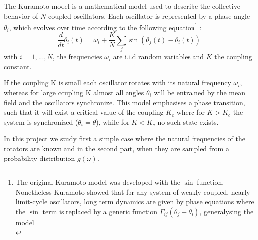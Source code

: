 
The Kuramoto model is a mathematical model used to describe the collective behavior of $N$ coupled oscillators. Each oscillator is represented by a phase angle $\theta_i$, which evolves over time according to the following equation\footnote{The original Kuramoto model was developed with the $\sin$ function. Nonetheless Kuramoto showed that for any system of weakly coupled, nearly limit-cycle oscillators, long term dynamics are given by phase equations where the $\sin$ term is replaced by a generic function $\Gamma_{ij}(\theta_j-\theta_i)$, generalysing the model \\} :
\begin{equation}
    \frac{d}{dt}\theta_i(t) = \omega_i + \frac{K}{N} \sum_j \sin(\theta_j(t) - \theta_i(t))
    \label{eq:kura}
\end{equation}
with $i = 1, . . . , N$, the frequencies $\omega_i$ are i.i.d random variables and $K$ the coupling constant. 

If the coupling K is small each oscillator rotates with its natural frequency $\omega_i$, whereas for large coupling K almost all angles $\theta_i$ will be entrained by the mean field and the oscillators synchronize. This model emphasises a phase transition, such that it will exist a critical value of the coupling $K_c$ where for $K>K_c$ the system is synchronized ($\dot{\theta_i} = \dot{\theta}$), while for $K<K_c$ no such state exists.

In this project we study first a simple case where the natural frequencies of the rotators are known and in the second part, when they are sampled from a probability distribution $g(\omega)$.